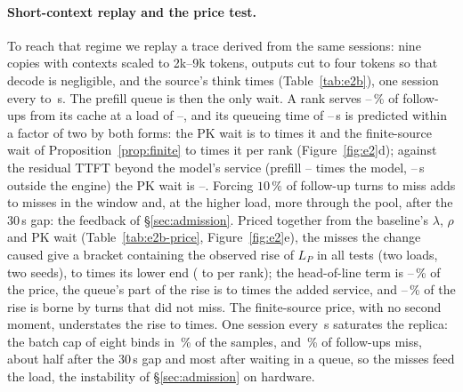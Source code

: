 \documentclass{article}
\theoremstyle{plain}
\theoremstyle{definition}
\theoremstyle{remark}
\begin{document}
\paragraph{Short-context replay and the price test.} To reach that regime
we replay a trace derived from the same sessions: nine copies with
contexts scaled to 2k--9k tokens, outputs cut to four tokens so that
decode is negligible, and the source's think times
(Table~\ref{tab:e2b}), one session every \eTwobSpacingLo{} to
\eTwobSpacingHi\,s. The prefill queue is then the only wait. A rank
serves \eTwobHitLo--\eTwobHitHi\,\% of follow-ups from its cache at a
load of \eTwobRhoLo--\eTwobRhoHi, and its queueing time of
\eTwobWqLo--\eTwobWqHi\,s is predicted within a factor
of two by both forms: the PK wait is \eTwobPkOverWqLo{} to
\eTwobPkOverWqHi{} times it and the finite-source wait of
Proposition~\ref{prop:finite} \eTwobFinOverWqLo{} to \eTwobFinOverWqHi{}
times it per rank (Figure~\ref{fig:e2}d); against the residual TTFT
beyond the model's service (prefill
\eTwobPfOverEsLo--\eTwobPfOverEsHi{} times the model,
\eTwobFrontLo--\eTwobFrontHi\,s outside the engine) the PK wait is
\eTwobPkOverWobsLo--\eTwobPkOverWobsHi{}. Forcing $10\,\%$ of follow-up
turns to miss adds \eTwobForcedLo{} to \eTwobForcedHi{} misses in the
window and, at the higher load, \eTwobExtraMissHi{} more through the
pool, after the 30\,s gap: the feedback of \S\ref{sec:admission}. Priced together from the baseline's $\lambda$, $\rho$
and PK wait (Table~\ref{tab:e2b-price}, Figure~\ref{fig:e2}e), the
misses the change caused give a bracket containing the observed rise
of $L_P$ in all \eTwobPriceRows{} tests (two loads, two seeds),
\eTwobDlOverLoLo{} to \eTwobDlOverLoHi{} times its lower end (\eTwobSpreadLo{} to \eTwobSpreadHi{} per rank); the
head-of-line term is \eTwobHolShareLo--\eTwobHolShareHi\,\% of the
price, the queue's part of the rise is \eTwobQueueOverServiceLo{} to
\eTwobQueueOverServiceHi{} times the added service, and
\eTwobBystanderLo--\eTwobBystanderHi\,\% of the rise is borne by turns
that did not miss. The finite-source price, with no second moment,
understates the rise \eTwobDlOverFinLo{} to \eTwobDlOverFinHi{} times.
One session every \eTwobSatSpacing\,s saturates the replica: the batch
cap of eight binds in \eTwobSatCapShare\,\% of the samples, and
\eTwobSatMissShare\,\% of
follow-ups miss, about half after the 30\,s gap and most after waiting
in a queue, so the misses feed the load, the instability of
\S\ref{sec:admission} on hardware.

\end{document}
